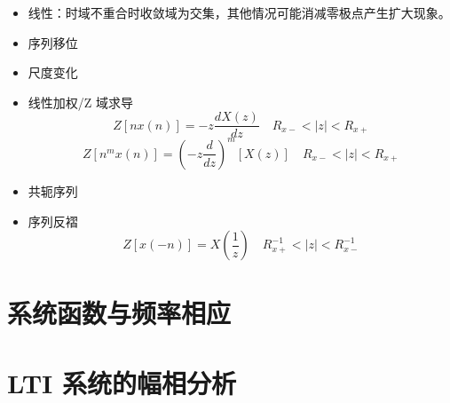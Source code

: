\documentclass[cn,11pt,chinese,black,simple]{../elegantbook}
\begin{document}
\begin{itemize}
    \item 线性：时域不重合时收敛域为交集，其他情况可能消减零极点产生扩大现象。
    \item 序列移位
    \item 尺度变化
    \item 线性加权/Z 域求导
    \begin{equation}Z[n x(n)]=-z \frac{d X(z)}{d z} \quad R_{x-}<|z|<R_{x+}\end{equation}
    \begin{equation}Z\left[n^{m} x(n)\right]=\left(-z \frac{d}{d z}\right)^{m}[X(z)] \quad R_{x-}<|z|<R_{x+}\end{equation}
    \item 共轭序列
    \item 序列反褶
    \begin{equation}Z[x(-n)]=X\left(\frac{1}{z}\right) \quad R_{x+}^{-1}<|z|<R_{x-}^{-1}\end{equation}
\end{itemize}


\section{系统函数与频率相应}

\section{LTI 系统的幅相分析}

\let\chapname\undefined
\ifx\mainclass\undefined
\end{document}
